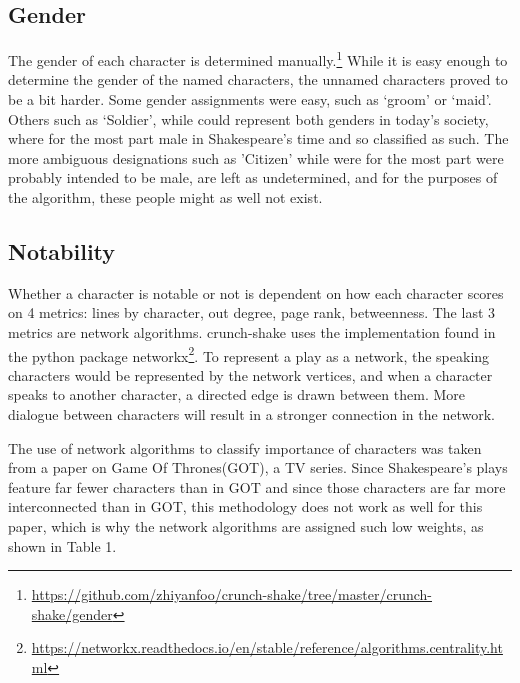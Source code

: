 \documentclass[12pt]{article}
\begin{document}
\subsection{Gender}
\label{sub:gender}

The gender of each character is determined
manually.\footnote{\url{https://github.com/zhiyanfoo/crunch-shake/tree/master/crunch-shake/gender}} While it is easy enough to determine the gender of the named characters, the
unnamed characters proved to be a bit harder. Some gender assignments were
easy, such as `groom' or `maid'. Others such as `Soldier', while could
represent both genders in today's society, where for the most part male in
Shakespeare's time and so classified as such. The more ambiguous designations
such as 'Citizen' while were for the most part were probably intended to be male,
are left as undetermined, and for the purposes of the algorithm, these people
might as well not exist.

\subsection{Notability}
\label{sub:notability}

Whether a character is notable or not is dependent on how each character
scores on 4 metrics: lines by character, out degree, page rank, betweenness.
The last 3 metrics are network algorithms. crunch-shake uses the
implementation found in the python package networkx\footnote{\url{https://networkx.readthedocs.io/en/stable/reference/algorithms.centrality.html}}.
To represent a play as a network, the speaking characters would be represented
by the network vertices, and when a character speaks to another character, a
directed edge is drawn between them. More dialogue between characters will
result in a stronger connection in the network.

The use of network algorithms to classify importance of characters was taken
from a paper on Game Of Thrones(GOT)\cite{got}, a TV series. Since
Shakespeare's plays feature far fewer characters than in GOT and since those
characters are far more interconnected than in GOT, this methodology does not
work as well for this paper, which is why the network algorithms are assigned
such low weights, as shown in Table 1.
\end{document}
